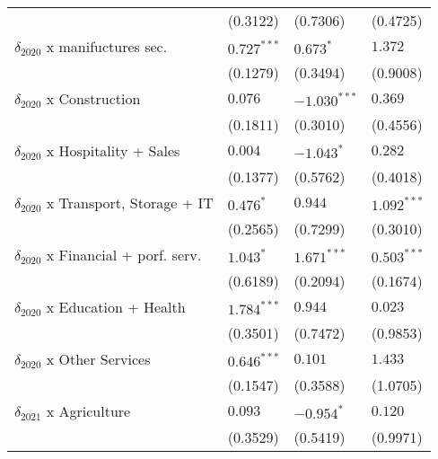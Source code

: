 \begin{tabular}{llll}
                                                   &           (0.3122) &           (0.7306) &           (0.4725) \\
$\delta_{2020}$ x manifuctures sec.                &      $0.727^{***}$ &          $0.673^*$ &            $1.372$ \\
                                                   &           (0.1279) &           (0.3494) &           (0.9008) \\
$\delta_{2020}$ x Construction                     &            $0.076$ &     $-1.030^{***}$ &            $0.369$ \\
                                                   &           (0.1811) &           (0.3010) &           (0.4556) \\
$\delta_{2020}$ x Hospitality + Sales              &            $0.004$ &         $-1.043^*$ &            $0.282$ \\
                                                   &           (0.1377) &           (0.5762) &           (0.4018) \\
$\delta_{2020}$ x Transport, Storage + IT          &          $0.476^*$ &            $0.944$ &      $1.092^{***}$ \\
                                                   &           (0.2565) &           (0.7299) &           (0.3010) \\
$\delta_{2020}$ x Financial + porf. serv.          &          $1.043^*$ &      $1.671^{***}$ &      $0.503^{***}$ \\
                                                   &           (0.6189) &           (0.2094) &           (0.1674) \\
$\delta_{2020}$ x Education + Health               &      $1.784^{***}$ &            $0.944$ &            $0.023$ \\
                                                   &           (0.3501) &           (0.7472) &           (0.9853) \\
$\delta_{2020}$ x Other Services                   &      $0.646^{***}$ &            $0.101$ &            $1.433$ \\
                                                   &           (0.1547) &           (0.3588) &           (1.0705) \\
$\delta_{2021}$ x Agriculture                      &            $0.093$ &         $-0.954^*$ &            $0.120$ \\
                                                   &           (0.3529) &           (0.5419) &           (0.9971) \\

\end{tabular}
